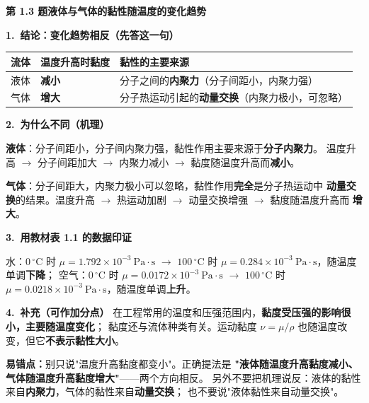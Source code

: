 \noindent\textbf{第 1.3 题\quad 液体与气体的黏性随温度的变化趋势}

\begin{jie}
\textbf{1.\ 结论：变化趋势相反（先答这一句）}

\begin{center}
\begin{tabularx}{\textwidth}{@{}lXX@{}}
\toprule
流体 & 温度升高时黏度 & 黏性的主要来源 \\
\midrule
液体 & \textbf{减小} & 分子之间的\textbf{内聚力}（分子间距小，内聚力强） \\
气体 & \textbf{增大} & 分子热运动引起的\textbf{动量交换}（内聚力极小，可忽略） \\
\bottomrule
\end{tabularx}
\end{center}

\textbf{2.\ 为什么不同（机理）}
\begin{xiaowen}
\item \textbf{液体}：分子间距小，分子间内聚力强，黏性作用主要来源于\textbf{分子内聚力}。
温度升高 $\to$ 分子间距加大 $\to$ 内聚力减小 $\to$ 黏度随温度升高而\textbf{减小}。
\item \textbf{气体}：分子间距大，内聚力极小可以忽略，黏性作用\textbf{完全}是分子热运动中
\textbf{动量交换}的结果。温度升高 $\to$ 热运动加剧 $\to$ 动量交换增强 $\to$ 黏度随温度升高而
\textbf{增大}。
\end{xiaowen}

\textbf{3.\ 用教材表 1.1 的数据印证}

水：$0\,^\circ\mathrm{C}$ 时 $\mu=1.792\times10^{-3}\ \mathrm{Pa\cdot s}$ $\to$
$100\,^\circ\mathrm{C}$ 时 $\mu=0.284\times10^{-3}\ \mathrm{Pa\cdot s}$，随温度单调\textbf{下降}；
空气：$0\,^\circ\mathrm{C}$ 时 $\mu=0.0172\times10^{-3}\ \mathrm{Pa\cdot s}$ $\to$
$100\,^\circ\mathrm{C}$ 时 $\mu=0.0218\times10^{-3}\ \mathrm{Pa\cdot s}$，随温度单调\textbf{上升}。

\textbf{4.\ 补充（可作加分点）}
在工程常用的温度和压强范围内，\textbf{黏度受压强的影响很小，主要随温度变化}；
黏度还与流体种类有关。运动黏度 $\nu=\mu/\rho$ 也随温度改变，但它\textbf{不表示黏性大小}。
\end{jie}

\begin{yicuo}
\textbf{易错点：}别只说"温度升高黏度都变小"。正确提法是
\textbf{"液体随温度升高黏度减小、气体随温度升高黏度增大"}——两个方向相反。
另外不要把机理说反：液体的黏性来自\textbf{内聚力}，气体的黏性来自\textbf{动量交换}；
也不要说"液体黏性来自动量交换"。
\end{yicuo}

